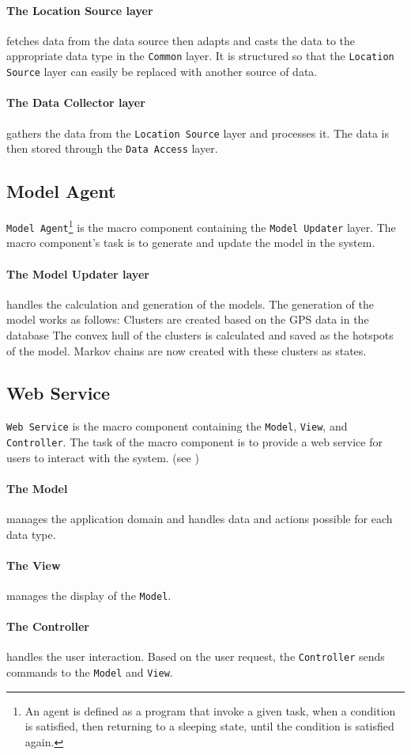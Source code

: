 \paragraph{The Location Source layer} fetches data from the data source then adapts and casts the data to the appropriate data type in the \texttt{Common} layer.
It is structured so that the \texttt{Location Source} layer can easily be replaced with another source of data.

\paragraph{The Data Collector layer} gathers the data from the \texttt{Location Source} layer and processes it. 
The data is then stored through the \texttt{Data Access} layer.


\subsection{Model Agent}
\texttt{Model Agent}\footnote{An agent is defined as a program that invoke a given task, when a condition is satisfied, then returning to a sleeping state, until the condition is satisfied again.\cite{definitionagent}} is the macro component containing the \texttt{Model Updater} layer.
The macro component's task is to generate and update the model in the system. 

\paragraph{The Model Updater layer} handles the calculation and generation of the models.
The generation of the model works as follows:
Clusters are created based on the GPS data in the database
The convex hull of the clusters is calculated and saved as the hotspots of the model.
Markov chains are now created with these clusters as states.

\subsection{Web Service}\label{arch:webservice}
\texttt{Web Service} is the macro component containing the \texttt{Model}, \texttt{View}, and \texttt{Controller}.
The task of the macro component is to provide a web service for users to interact with the system. (see )

\paragraph{The Model} manages the application domain and handles data and actions possible for each data type.

\paragraph{The View} manages the display of the \texttt{Model}.

\paragraph{The Controller} handles the user interaction. Based on the user request, the \texttt{Controller} sends commands to the \texttt{Model} and \texttt{View}.